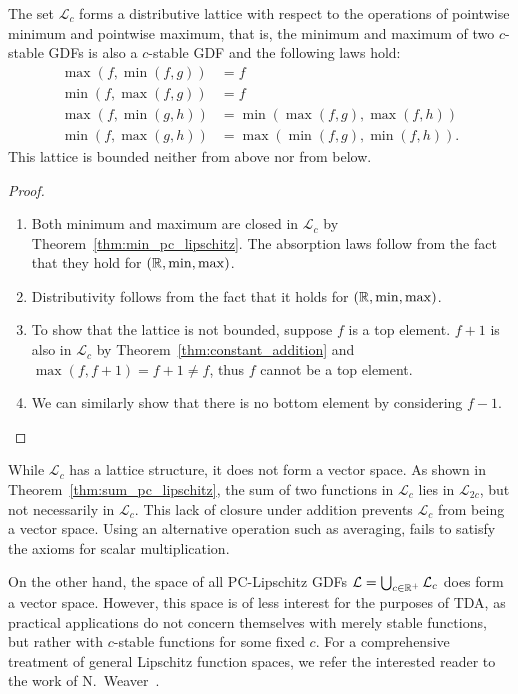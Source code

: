 \begin{theorem}
    The set $\mathcal{L}_c$ forms a distributive lattice with respect to the
    operations of pointwise minimum and pointwise maximum, that is, the minimum
    and maximum of two $c$-stable GDFs is also a $c$-stable GDF and the following laws hold:
    \begin{align}
        \max(f, \min(f, g)) & = f \\
        \min(f, \max(f, g)) & = f \\
        \max(f, \min(g, h)) & = \min(\max(f, g), \max(f, h)) \\
        \min(f, \max(g, h)) & = \max(\min(f, g), \min(f, h)).
    \end{align}
    This lattice is bounded neither from above nor from below.
\end{theorem}
\begin{proof}
    \begin{enumerate}
        \item Both minimum and maximum are closed in $\mathcal{L}_c$ by
            Theorem~\ref{thm:min_pc_lipschitz}. The absorption laws follow from
            the fact that they hold for $(\mathbb{R}, \min, \max)$.
        \item Distributivity follows from the fact that it holds for $(\mathbb{R}, \min, \max)$.
        \item To show that the lattice is not bounded, suppose $f$ is a top
            element. $f + 1$ is also in $\mathcal{L}_c$ by
            Theorem~\ref{thm:constant_addition} and $\max(f, f + 1) = f + 1 \neq
            f$, thus $f$ cannot be a top element. 
        \item We can similarly show that there is no bottom element by
            considering $f - 1$.
    \end{enumerate}
\end{proof}

While $\mathcal{L}_c$ has a lattice structure, it does not form a vector space.
As shown in Theorem~\ref{thm:sum_pc_lipschitz}, the sum of two
functions in $\mathcal{L}_c$ lies in $\mathcal{L}_{2c}$, but not necessarily in
$\mathcal{L}_c$. This lack of closure under addition prevents $\mathcal{L}_c$
from being a vector space. Using an alternative operation such as averaging,
fails to satisfy the axioms for scalar multiplication.

On the other hand, the space of all PC-Lipschitz GDFs
$\mathcal{L} = \bigcup_{c \in \mathbb{R}^+} \mathcal{L}_c$ does form a vector space.
However, this space is of less interest for the purposes of TDA, as practical
applications do not concern themselves with merely stable functions, but rather
with $c$-stable functions for some fixed $c$.
For a comprehensive treatment of general Lipschitz function spaces,
we refer the interested reader to the work of N.~Weaver~\cite{weaver2018lipschitz}.

